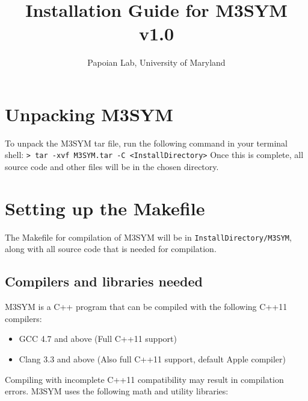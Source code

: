 \documentclass[11pt, oneside]{article}   	%
\title{Installation Guide for M3SYM v1.0}
\author{Papoian Lab, University of Maryland}
\date{}							%
\begin{document}
\maketitle

\tableofcontents
\newpage

\section{Unpacking M3SYM}
 
 To unpack the M3SYM tar file, run the following command in your terminal shell: \newline \newline \indent\texttt{> tar -xvf M3SYM.tar -C <InstallDirectory>} \newline \newline Once this is complete, all source code and other files will be in the chosen directory.
 
 
\section{Setting up the Makefile}

The Makefile for compilation of M3SYM will be in \texttt{InstallDirectory/M3SYM}, along with all source code that is needed for compilation.

\subsection {Compilers and libraries needed}

M3SYM is a C++ program that can be compiled with the following C++11 compilers:

\begin{itemize}
\item GCC 4.7 and above (Full C++11 support)
\item  Clang 3.3 and above (Also full C++11 support, default Apple compiler)
\end{itemize}  

\noindent Compiling with incomplete C++11 compatibility may result in compilation errors. \newline M3SYM uses the following math and utility libraries:
\end{document}
